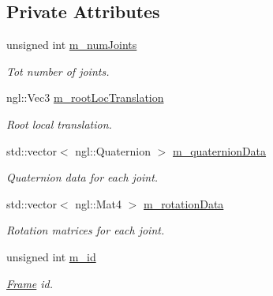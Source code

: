 \subsection*{Private Attributes}
\begin{DoxyCompactItemize}
\item 
unsigned int \hyperlink{class_frame_a5daf5c6beec390e01ed5be5c5b3d536c}{m\+\_\+num\+Joints}\hypertarget{class_frame_a5daf5c6beec390e01ed5be5c5b3d536c}{}\label{class_frame_a5daf5c6beec390e01ed5be5c5b3d536c}

\begin{DoxyCompactList}\small\item\em Tot number of joints. \end{DoxyCompactList}\item 
ngl\+::\+Vec3 \hyperlink{class_frame_a3bc0347f803a30b3384ddd80d42d6619}{m\+\_\+root\+Loc\+Translation}\hypertarget{class_frame_a3bc0347f803a30b3384ddd80d42d6619}{}\label{class_frame_a3bc0347f803a30b3384ddd80d42d6619}

\begin{DoxyCompactList}\small\item\em Root local translation. \end{DoxyCompactList}\item 
std\+::vector$<$ ngl\+::\+Quaternion $>$ \hyperlink{class_frame_a86fbc9adf4cd80d64632884532125e12}{m\+\_\+quaternion\+Data}\hypertarget{class_frame_a86fbc9adf4cd80d64632884532125e12}{}\label{class_frame_a86fbc9adf4cd80d64632884532125e12}

\begin{DoxyCompactList}\small\item\em Quaternion data for each joint. \end{DoxyCompactList}\item 
std\+::vector$<$ ngl\+::\+Mat4 $>$ \hyperlink{class_frame_a1f400adaf842c37fc2ef3b23c3721451}{m\+\_\+rotation\+Data}\hypertarget{class_frame_a1f400adaf842c37fc2ef3b23c3721451}{}\label{class_frame_a1f400adaf842c37fc2ef3b23c3721451}

\begin{DoxyCompactList}\small\item\em Rotation matrices for each joint. \end{DoxyCompactList}\item 
unsigned int \hyperlink{class_frame_a5dd14a76a8ed29f6c169b5f3b32e01c2}{m\+\_\+id}\hypertarget{class_frame_a5dd14a76a8ed29f6c169b5f3b32e01c2}{}\label{class_frame_a5dd14a76a8ed29f6c169b5f3b32e01c2}

\begin{DoxyCompactList}\small\item\em \hyperlink{class_frame}{Frame} id. \end{DoxyCompactList}\end{DoxyCompactItemize}


